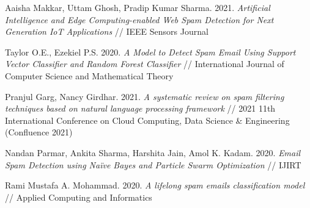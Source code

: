 \documentclass[12pt]{article}
\begin{document}
\begin{thebibliography}{99}
Aaisha Makkar, Uttam Ghosh, Pradip Kumar Sharma.
2021. \emph{Artificial Intelligence and Edge Computing-enabled
	Web Spam Detection for Next Generation IoT
	Applications} // IEEE Sensors Journal

Taylor O.E., Ezekiel P.S.
2020. \emph{A Model to Detect Spam Email Using Support Vector Classifier and Random Forest Classifier} //
International Journal of Computer Science and Mathematical Theory

Pranjul Garg, Nancy Girdhar.
2021. \emph{A systematic review on spam filtering techniques based on
natural language processing framework} // 2021 11th International Conference on Cloud Computing, Data Science \& Engineering (Confluence 2021)

Nandan Parmar, Ankita Sharma, Harshita Jain, Amol K. Kadam.
2020. \emph{Email Spam Detection using Naïve Bayes and Particle Swarm Optimization} // IJIRT

Rami Mustafa A. Mohammad.
2020. \emph{A lifelong spam emails 	classification model} //
Applied Computing and Informatics
\end{thebibliography}
\end{document}
